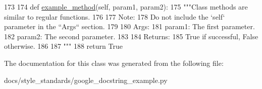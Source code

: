 \begin{DoxyCode}
173 
174     \textcolor{keyword}{def }\hyperlink{classgoogle__docstring__example_1_1ExampleClass_aa1788edcf36597ca202110e4f1e540a1}{example\_method}(self, param1, param2):
175         \textcolor{stringliteral}{"""Class methods are similar to regular functions.}
176 \textcolor{stringliteral}{}
177 \textcolor{stringliteral}{        Note:}
178 \textcolor{stringliteral}{          Do not include the `self` parameter in the ``Args`` section.}
179 \textcolor{stringliteral}{}
180 \textcolor{stringliteral}{        Args:}
181 \textcolor{stringliteral}{          param1: The first parameter.}
182 \textcolor{stringliteral}{          param2: The second parameter.}
183 \textcolor{stringliteral}{}
184 \textcolor{stringliteral}{        Returns:}
185 \textcolor{stringliteral}{          True if successful, False otherwise.}
186 \textcolor{stringliteral}{}
187 \textcolor{stringliteral}{        """}
188         \textcolor{keywordflow}{return} \textcolor{keyword}{True}

\end{DoxyCode}


The documentation for this class was generated from the following file\-:\begin{DoxyCompactItemize}
\item 
docs/style\-\_\-standards/google\-\_\-docstring\-\_\-example.\-py\end{DoxyCompactItemize}
